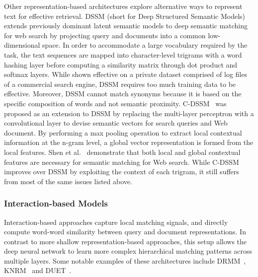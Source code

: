 Other representation-based architectures explore alternative ways to represent text for effective retrieval.
DSSM (short for Deep Structured Semantic Models)~\cite{huang2013learning} extends previously dominant latent semantic models to deep semantic matching for web search by projecting query and documents into a common low-dimensional space.
In order to accommodate a large vocabulary required by the task, the text sequences are mapped into character-level trigrams with a word hashing layer before computing a similarity matrix through dot product and softmax layers.
While shown effective on a private dataset comprised of log files of a commercial search engine, DSSM requires too much training data to be effective.
Moreover, DSSM cannot match synonyms because it is based on the specific composition of words and not semantic proximity.
C-DSSM~\cite{shen2014learning} was proposed as an extension to DSSM by replacing the multi-layer perceptron with a convolutional layer to devise semantic vectors for search queries and Web document.
By performing a max pooling operation to extract local contextual information at the n-gram level, a global vector representation is formed from the local features.
Shen et al.~\cite{shen2014learning} demonstrate that both local and global contextual features are necessary for semantic matching for Web search.
While C-DSSM improves over DSSM by exploiting the context of each trigram, it still suffers from most of the same issues listed above.

\subsubsection{Interaction-based Models}

Interaction-based approaches capture local matching signals, and directly compute word-word similarity between query and document representations.
In contrast to more shallow representation-based approaches, this setup allows the deep neural network to learn more complex hierarchical matching patterns across multiple layers.
Some notable examples of these architectures include DRMM~\cite{guo2017drmm}, KNRM~\cite{xiong2017knrm} and DUET~\cite{mitra2017learning}.

